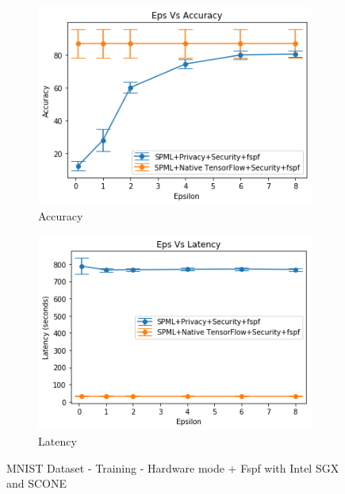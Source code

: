 \begin{figure}
     \begin{subfigure}{0.5\textwidth}
         \includegraphics[width=\textwidth]{images/Training/MnistHWFSPFAccuracy.png}
         \caption{Accuracy}
         \label{fig:fspfMnistAccuracyTraining}
     \end{subfigure}
     \begin{subfigure}{0.5\textwidth}
         \includegraphics[width=\textwidth]{images/Training/MnistHWFSPFLatency.png}
         \caption{Latency}
         \label{fig:fspfMnistLatencyTraining}
     \end{subfigure}
        \caption{MNIST Dataset - Training - Hardware mode + Fspf with Intel SGX and SCONE}
\end{figure}
